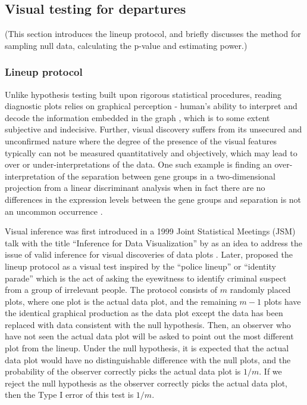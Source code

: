 \documentclass[]{interact}
\theoremstyle{plain}%
\theoremstyle{definition}
\theoremstyle{remark}
\begin{document}
\hypertarget{visual-testing-for-departures}{%
\subsection{Visual testing for
departures}\label{visual-testing-for-departures}}

(This section introduces the lineup protocol, and briefly discusses the
method for sampling null data, calculating the p-value and estimating
power.)

\hypertarget{lineup-protocol}{%
\subsubsection{Lineup protocol}\label{lineup-protocol}}

Unlike hypothesis testing built upon rigorous statistical procedures,
reading diagnostic plots relies on graphical perception - human's
ability to interpret and decode the information embedded in the graph
\citep{cleveland_graphical_1984}, which is to some extent subjective and
indecisive. Further, visual discovery suffers from its unsecured and
unconfirmed nature where the degree of the presence of the visual
features typically can not be measured quantitatively and objectively,
which may lead to over or under-interpretations of the data. One such
example is finding an over-interpretation of the separation between gene
groups in a two-dimensional projection from a linear discriminant
analysis when in fact there are no differences in the expression levels
between the gene groups and separation is not an uncommon occurrence
\citep{roy_chowdhury_using_2015}.

Visual inference was first introduced in a 1999 Joint Statistical
Meetings (JSM) talk with the title ``Inference for Data Visualization''
by \citet{buja_inference_1999} as an idea to address the issue of valid
inference for visual discoveries of data plots
\citep{gelman_exploratory_2004}. Later, \citet{buja_statistical_2009}
proposed the lineup protocol as a visual test inspired by the ``police
lineup'' or ``identity parade'' which is the act of asking the
eyewitness to identify criminal suspect from a group of irrelevant
people. The protocol consists of \(m\) randomly placed plots, where one
plot is the actual data plot, and the remaining \(m - 1\) plots have the
identical graphical production as the data plot except the data has been
replaced with data consistent with the null hypothesis. Then, an
observer who have not seen the actual data plot will be asked to point
out the most different plot from the lineup. Under the null hypothesis,
it is expected that the actual data plot would have no distinguishable
difference with the null plots, and the probability of the observer
correctly picks the actual data plot is \(1/m\). If we reject the null
hypothesis as the observer correctly picks the actual data plot, then
the Type I error of this test is \(1/m\).
\end{document}
